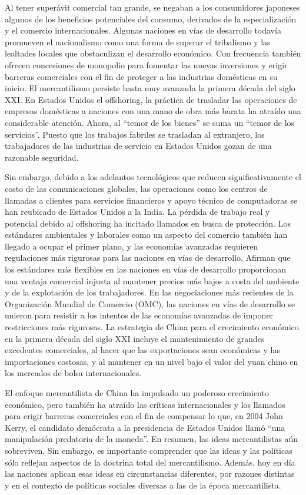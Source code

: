 \documentclass[
  stu,
  floatsintext,
  longtable,
  a4paper,
  nolmodern,
  notxfonts,
  notimes,
  12pt,
  colorlinks=true,linkcolor=blue,citecolor=blue,urlcolor=blue]{apa7}
\begin{document}
Al tener superávit comercial tan grande, se negaban a los consumidores
japoneses algunos de los beneficios potenciales del consumo, derivados
de la especialización y el comercio internacionales. Algunas naciones en
vías de desarrollo todavía promueven el nacionalismo como una forma de
superar el tribalismo y las lealtades locales que obstaculizan el
desarrollo económico. Con frecuencia también ofrecen concesiones de
monopolio para fomentar las nuevas inversiones y erigir barreras
comerciales con el fin de proteger a las industrias domésticas en su
inicio. El mercantilismo persiste hasta muy avanzada la primera década
del siglo XXI. En Estados Unidos el offshoring, la práctica de trasladar
las operaciones de empresas domésticas a naciones con una mano de obra
más barata ha atraído una considerable atención. Ahora, al ``temor de
los bienes'' se suma un ``temor de los servicios''. Puesto que los
trabajos fabriles se trasladan al extranjero, los trabajadores de las
industrias de servicio en Estados Unidos gozan de una razonable
seguridad.

Sin embargo, debido a los adelantos tecnológicos que reducen
significativamente el costo de las comunicaciones globales, las
operaciones como los centros de llamadas a clientes para servicios
financieros y apoyo técnico de computadoras se han reubicado de Estados
Unidos a la India. La pérdida de trabajo real y potencial debido al
offshoring ha incitado llamados en busca de protección. Los estándares
ambientales y laborales como un aspecto del comercio también han llegado
a ocupar el primer plano, y las economías avanzadas requieren
regulaciones más rigurosas para las naciones en vías de desarrollo.
Afirman que los estándares más flexibles en las naciones en vías de
desarrollo proporcionan una ventaja comercial injusta al mantener
precios más bajos a costa del ambiente y de la explotación de los
trabajadores. En las negociaciones más recientes de la Organización
Mundial de Comercio (OMC), las naciones en vías de desarrollo se unieron
para resistir a los intentos de las economías avanzadas de imponer
restricciones más rigurosas. La estrategia de China para el crecimiento
económico en la primera década del siglo XXI incluye el mantenimiento de
grandes excedentes comerciales, al hacer que las exportaciones sean
económicas y las importaciones costosas, y al mantener en un nivel bajo
el valor del yuan chino en los mercados de bolsa internacionales.

El enfoque mercantilista de China ha impulsado un poderoso crecimiento
económico, pero también ha atraído las críticas internacionales y los
llamados para erigir barreras comerciales con el fin de compensar lo
que, en 2004 John Kerry, el candidato demócrata a la presidencia de
Estados Unidos llamó ``una manipulación predatoria de la moneda''. En
resumen, las ideas mercantilistas aún sobreviven. Sin embargo, es
importante comprender que las ideas y las políticas sólo reflejan
aspectos de la doctrina total del mercantilismo. Además, hoy en día las
naciones aplican esas ideas en circunstancias diferentes, por razones
distintas y en el contexto de políticas sociales diversas a las de la
época mercantilista.
\end{document}
